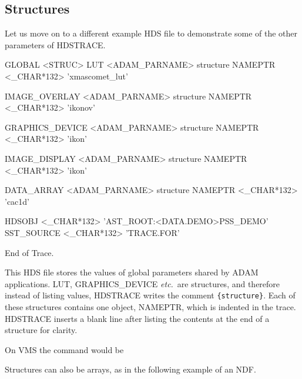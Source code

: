 \documentclass[11pt,nolof]{starlink}
\begin{document}
\subsection{Structures}

Let us move on to a different example HDS file to demonstrate some of
the other parameters of {\footnotesize HDSTRACE}.

\small
\begin{terminalv}

GLOBAL  <STRUC>
  LUT            <ADAM_PARNAME>     {structure}
     NAMEPTR        <_CHAR*132>        'xmascomet_lut'

  IMAGE_OVERLAY  <ADAM_PARNAME>     {structure}
     NAMEPTR        <_CHAR*132>        'ikonov'

  GRAPHICS_DEVICE  <ADAM_PARNAME>   {structure}
     NAMEPTR        <_CHAR*132>        'ikon'

  IMAGE_DISPLAY  <ADAM_PARNAME>     {structure}
     NAMEPTR        <_CHAR*132>        'ikon'

  DATA_ARRAY     <ADAM_PARNAME>     {structure}
     NAMEPTR        <_CHAR*132>        'cac1d'

  HDSOBJ         <_CHAR*132>        'AST_ROOT:<DATA.DEMO>PSS_DEMO'
  SST_SOURCE     <_CHAR*132>        'TRACE.FOR'

End of Trace.
\end{terminalv}
\normalsize

This HDS file stores the values of global parameters shared by ADAM
applications.  LUT, GRAPHICS\_DEVICE \textit{etc.}\ are structures, and
therefore instead of listing values, {\footnotesize HDSTRACE} writes the
comment \texttt{\{structure\}}.  Each of these structures contains one
object, NAMEPTR, which is indented in the trace.  {\footnotesize HDSTRACE} inserts
a blank line after listing the contents at the end of a structure for
clarity.

On VMS the command would be

\small
{}
\normalsize
Structures can also be arrays, as in the following example of an NDF.
\end{document}

